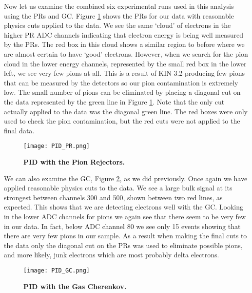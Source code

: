 Now let us examine the combined six experimental runs used in this analysis using the PRs and GC. Figure \ref{fig:pid_pr} shows the PRs for our data with reasonable physics cuts applied to the data. We see the same `cloud' of electrons in the higher PR ADC channels indicating that electron energy is being well measured by the PRs. The red box in this cloud shows a similar region to before where we are almost certain to have `good' electrons. However, when we search for the pion cloud in the lower energy channels, represented by the small red box in the lower left, we see very few pions at all. This is a result of KIN 3.2 producing few pions that can be measured by the detectors so our pion contamination is extremely low. The small number of pions can be eliminated by placing a diagonal cut on the data represented by the green line in Figure \ref{fig:pid_pr}. Note that the only cut actually applied to the data was the diagonal green line. The red boxes were only used to check the pion contamination, but the red cuts were not applied to the final data.

\begin{figure}[!ht]
\begin{center}
\texttt{[image: PID\_PR.png]}
\end{center}
\caption[PID with the Pion Rejectors]{
{\bf{PID with the Pion Rejectors.}} }
\label{fig:pid_pr}
\end{figure}

We can also examine the GC, Figure \ref{fig:pid_gc}, as we did previously. Once again we have applied reasonable physics cuts to the data. We see a large bulk signal at its strongest between channels 300 and 500, shown between two red lines, as expected. This shows that we are detecting electrons well with the GC. Looking in the lower ADC channels for pions we again see that there seem to be very few in our data. In fact, below ADC channel 80 we see only 15 events showing that there are very few pions in our sample. As a result when making the final cuts to the data only the diagonal cut on the PRs was used to eliminate possible pions, and more likely, junk electrons which are most probably delta electrons.

\begin{figure}[!ht]
\begin{center}
\texttt{[image: PID\_GC.png]}
\end{center}
\caption[PID with the Gas Cherenkov]{
{\bf{PID with the Gas Cherenkov.}} }
\label{fig:pid_gc}
\end{figure}


